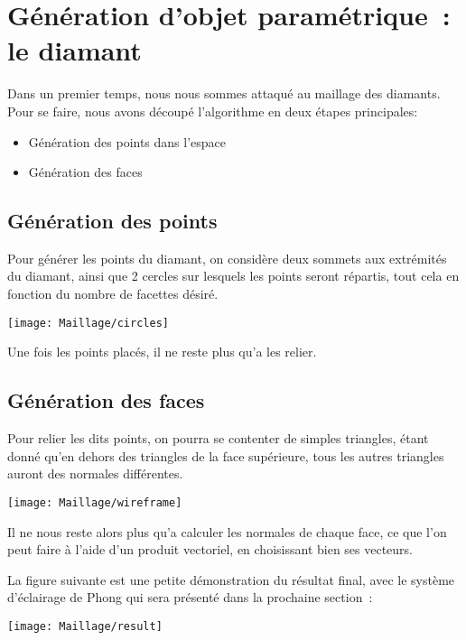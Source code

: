\section{Génération d'objet paramétrique~: le diamant}

Dans un premier temps, nous nous sommes attaqué au maillage des diamants.
Pour se faire, nous avons découpé l'algorithme en deux étapes principales:
\begin{itemize}
    \item Génération des points dans l'espace
    \item Génération des faces
\end{itemize}

\subsection{Génération des points}

Pour générer les points du diamant, on considère deux sommets aux extrémités du diamant, ainsi que 2 cercles sur lesquels
les points seront répartis, tout cela en fonction du nombre de facettes désiré.

{\centering \texttt{[image: Maillage/circles]}}

Une fois les points placés, il ne reste plus qu'a les relier.

\subsection{Génération des faces}
Pour relier les dits points, on pourra se contenter de simples triangles, étant donné
qu'en dehors des triangles de la face supérieure, tous les autres triangles auront des normales différentes.

{\centering \texttt{[image: Maillage/wireframe]}}

Il ne nous reste alors plus qu'a calculer les normales de chaque face, ce que l'on peut faire  à l'aide d'un produit
vectoriel, en choisissant bien ses vecteurs.

La figure suivante est une petite démonstration du résultat final, avec le système d'éclairage de Phong qui
sera présenté dans la prochaine section~:

{\centering \texttt{[image: Maillage/result]}}

